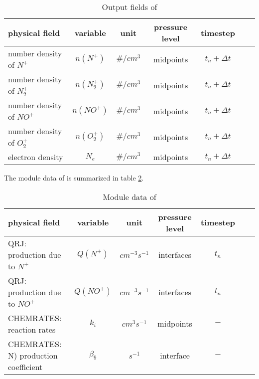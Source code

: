 \begin{table}[tb]
\begin{tabular}{|p{3.5cm} ||c|c|c|c|c|c|} \hline
physical field               & variable        & unit&pressure
level& timestep \\ \hline \hline
number density of $N^+$    & $n(N^+)$   & $\#/cm^3$   & midpoints  & $t_n+\Delta t$ \\
number density of $N_2^+$    & $n(N_2^+)$   & $\#/cm^3$   & midpoints  & $t_n+\Delta t$ \\
number density of $NO^+$    & $n(NO^+)$   & $\#/cm^3$   & midpoints  & $t_n+\Delta t$ \\
number density of $O_2^+$    & $n(O_2^+)$   & $\#/cm^3$   & midpoints  & $t_n+\Delta t$ \\
electron density     & $N_e$   & $\#/cm^3$   & midpoints  &
$t_n+\Delta t$
\\ \hline \hline
\end{tabular}
\caption{Output fields of }
\label{tab:output_elden}
\end{table}
%
%
The module data of  is summarized in table
\ref{tab:module_elden}.
%
\begin{table}[tb]
\begin{tabular}{|p{3.5cm} ||c|c|c|c|c|c|} \hline
physical field               & variable        & unit&pressure
level& timestep \\ \hline \hline QRJ: production due to $N^+$ &
{$Q(N^+)$}
&$cm^{-3}s^{-1}$ & interfaces & $t_n$  \\
QRJ: production due to $NO^+$ & {$Q(NO^+)$}
&$cm^{-3}s^{-1}$ & interfaces & $t_n$  \\
CHEMRATES: reaction rates & {$k_i$}
&$cm^{3}s^{-1}$ & midpoints & $-$  \\
CHEMRATES: N) production coefficient & {$\beta_9$} &$s^{-1}$ & interface & $-$ 
\\ \hline \hline
\end{tabular}
\caption{Module data of }
\label{tab:module_elden}
\end{table}
%

